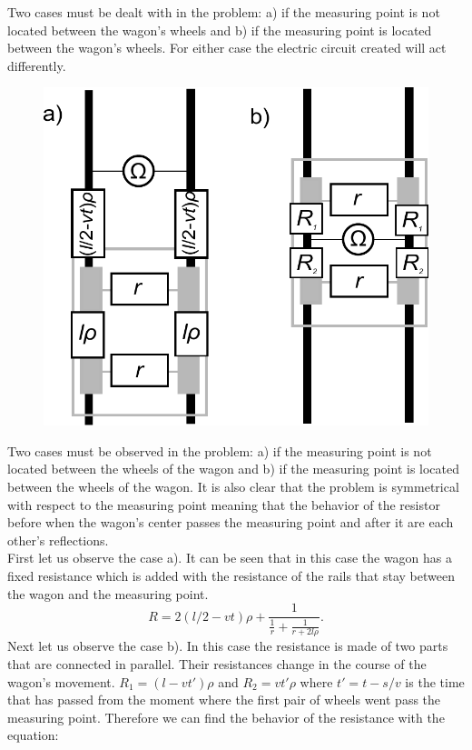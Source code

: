 {\ifEngHint
Two cases must be dealt with in the problem: a) if the measuring point is not located between the wagon's wheels and b) if the measuring point is located between the wagon's wheels. For either case the electric circuit created will act differently.
\fi


\ifEngSolution
\begin{figure}
\includegraphics[width=\linewidth]{2012-v2g-08-rong_lahendus}
\end{figure}
Two cases must be observed in the problem: a) if the measuring point is not located between the wheels of the wagon and b) if the measuring point is located between the wheels of the wagon. It is also clear that the problem is symmetrical with respect to the measuring point meaning that the behavior of the resistor before when the wagon’s center passes the measuring point and after it are each other’s reflections.\\
First let us observe the case a). It can be seen that in this case the wagon has a fixed resistance which is added with the resistance of the rails that stay between the wagon and the measuring point. 
\[
R=2(l/2-vt)\rho+\frac{1}{\frac{1}{r}+\frac{1}{r+2l\rho}}.
\] 
Next let us observe the case b). In this case the resistance is made of two parts that are connected in parallel. Their resistances change in the course of the wagon’s movement. $R_1=(l-vt')\rho$ and $R_2=vt'\rho$ where $t'=t-s/v$ is the time that has passed from the moment where the first pair of wheels went pass the measuring point. Therefore we can find the behavior of the resistance with the equation:
}
